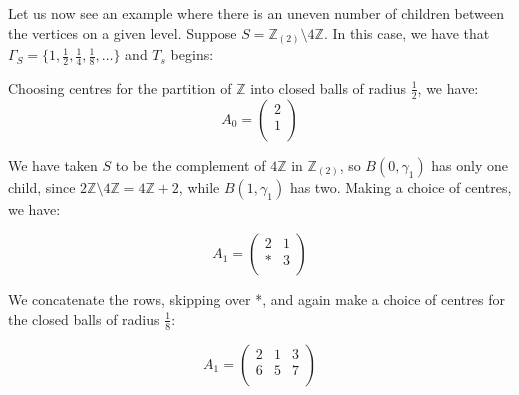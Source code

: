 \begin{example}
Let us now see an example where there is an uneven number of children between the vertices on a given level. Suppose $S=\mathbb{Z}_{(2)} \setminus 4\mathbb{Z}$. In this case, we have that $\Gamma_S=\{1, \frac{1}{2},\frac{1}{4},\frac{1}{8},\ldots \}$ and $T_s$ begins:

\begin{center}
\end{center}

Choosing centres for the partition of $\mathbb{Z}$ into closed balls of radius $\frac{1}{2}$, we have:
\[A_0=
 \begin{pmatrix}
2 \\
1  \\
\end{pmatrix}
\]

We have taken $S$ to be the complement of $4\mathbb{Z}$ in $\mathbb{Z}_{(2)}$, so $B(0,\gamma_1)$ has only one child, since $2\mathbb{Z} \setminus 4\mathbb{Z} = 4\mathbb{Z}+2$, while $B(1,\gamma_1)$ has two. Making a choice of centres, we have:

\[A_1=
 \begin{pmatrix}
2 & 1 \\
* & 3  \\
\end{pmatrix}
\]

We concatenate the rows, skipping over *, and again make a choice of centres for the closed balls of radius $\frac{1}{8}$:

\[A_1=
 \begin{pmatrix}
2 & 1 & 3 \\
6 & 5 & 7   \\
\end{pmatrix}
\]


\end{example}
